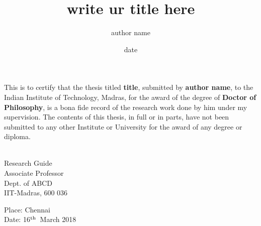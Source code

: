 \documentclass[PhD]{iitmdiss}
\begin{document}
\title{write ur title here}

\author{author name}

\date{date}

\maketitle


\certificate

\vspace*{0.5in}

\noindent This is to certify that the thesis titled {\bf title}, submitted by {\bf author name}, 
  to the Indian Institute of Technology, Madras, for
the award of the degree of {\bf Doctor of Philosophy}, is a bona fide
record of the research work done by him under my supervision.  The
contents of this thesis, in full or in parts, have not been submitted
to any other Institute or University for the award of any degree or
diploma.

\vspace*{1.5in}

\begin{singlespacing}
\hspace*{-0.25in}
\parbox{2.5in}{
 \\
\noindent Research Guide \\ 
\noindent Associate Professor \\
\noindent Dept. of ABCD\\
\noindent IIT-Madras, 600 036 \\
} 
\hspace*{1.56in} 
\parbox{2.5in}{
\vspace*{0.3in}
\noindent Place: Chennai\\
Date: 16$^{\textnormal{th}}$~March 2018
}  
\end{singlespacing}
\end{document}
